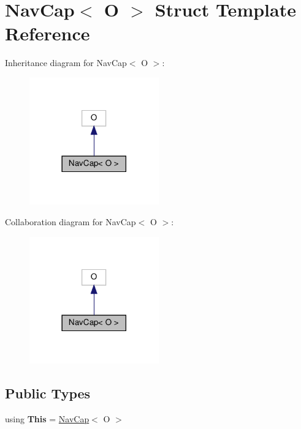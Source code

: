 \hypertarget{structNavCap}{}\section{Nav\+Cap$<$ O $>$ Struct Template Reference}
\label{structNavCap}


Inheritance diagram for Nav\+Cap$<$ O $>$\+:\nopagebreak
\begin{figure}[H]
\begin{center}
\leavevmode
\includegraphics[width=158pt]{structNavCap__inherit__graph}
\end{center}
\end{figure}


Collaboration diagram for Nav\+Cap$<$ O $>$\+:\nopagebreak
\begin{figure}[H]
\begin{center}
\leavevmode
\includegraphics[width=158pt]{structNavCap__coll__graph}
\end{center}
\end{figure}
\subsection*{Public Types}
\begin{DoxyCompactItemize}
\item 
\mbox{\label{structNavCap_ae03bc309180ea6ba3c2943b19adf8eb7}} 
using {\bfseries This} = \hyperlink{structNavCap}{Nav\+Cap}$<$ O $>$
\end{DoxyCompactItemize}
